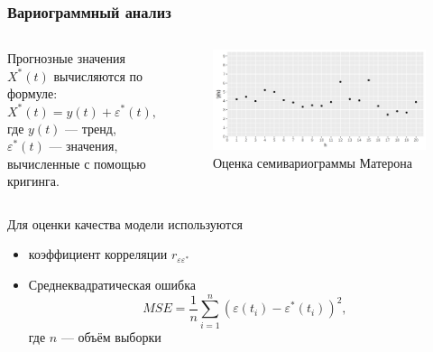 \documentclass[notheorems]{beamer}
\theoremstyle{definition}
\theoremstyle{example}
\theoremstyle{plain}
\begin{document}
\begin{frame}
  \frametitle{Вариограммный анализ}
  \begin{columns}[c]
    Прогнозные значения $ X^{*}(t) $ вычисляются по формуле:
    \begin{equation*}
      X^{*}(t) = y(t) + \varepsilon^{*}(t),
    \end{equation*}
    где $ y(t) $ --- тренд, $ \varepsilon^{*}(t) $ --- значения, вычисленные с помощью кригинга.

    \begin{figure}[h]
    \includegraphics[width=1\linewidth]{../../figures/variogram/lin-variogram.png}
    \caption{Оценка семивариограммы Матерона}
  \end{figure}
  \end{columns}
  
  \vspace{1em}
  
  Для оценки качества модели используются
  \begin{itemize}
    \item коэффициент корреляции $ r_{\varepsilon\varepsilon^{*}} $
    \item Среднеквадратическая ошибка
    \begin{equation}
      \label{eq:mse}
      MSE = \frac{1}{n} \sum_{i=1}^{n} (\varepsilon(t_i) - \varepsilon^{*}(t_i))^2,
    \end{equation}
    где $ n $ --- объём выборки
  \end{itemize}
\end{frame}
\end{document}
